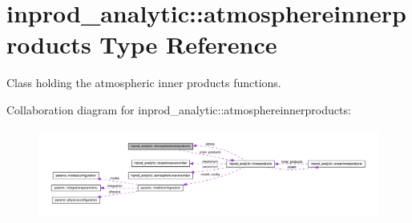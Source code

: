 \hypertarget{structinprod__analytic_1_1atmosphereinnerproducts}{}\section{inprod\+\_\+analytic\+:\+:atmosphereinnerproducts Type Reference}
\label{structinprod__analytic_1_1atmosphereinnerproducts}


Class holding the atmospheric inner products functions.  




Collaboration diagram for inprod\+\_\+analytic\+:\+:atmosphereinnerproducts\+:\nopagebreak
\begin{figure}[H]
\begin{center}
\leavevmode
\includegraphics[width=350pt]{structinprod__analytic_1_1atmosphereinnerproducts__coll__graph}
\end{center}
\end{figure}
